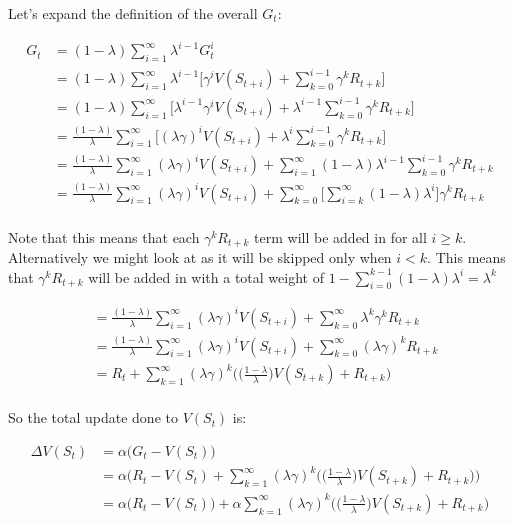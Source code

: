 \documentclass[11pt]{article}
\begin{document}
Let's expand the definition of the overall $G_t$:

\begin{align*}
G_t &= (1-\lambda) \sum_{i=1}^{\infty} \lambda^{i-1}G^i_t \\
&= (1-\lambda) \sum_{i=1}^{\infty} \lambda^{i-1} \big[ \gamma^i V(S_{t+i}) + \sum_{k=0}^{i - 1} \gamma^k R_{t+k} \big] \\
&= (1-\lambda) \sum_{i=1}^{\infty} \big[ \lambda^{i-1} \gamma^i V(S_{t+i}) + \lambda^{i-1}\sum_{k=0}^{i - 1} \gamma^k R_{t+k} \big] \\
&= \frac{(1-\lambda)}{\lambda} \sum_{i=1}^{\infty} \big[ (\lambda \gamma)^i V(S_{t+i}) + \lambda^{i}\sum_{k=0}^{i - 1} \gamma^k R_{t+k} \big] \\
&= \frac{(1-\lambda)}{\lambda} \sum_{i=1}^{\infty} (\lambda \gamma)^i V(S_{t+i}) + \sum_{i=1}^{\infty} (1 - \lambda) \lambda^{i - 1}\sum_{k=0}^{i - 1} \gamma^k R_{t+k} \\
&= \frac{(1-\lambda)}{\lambda} \sum_{i=1}^{\infty} (\lambda \gamma)^i V(S_{t+i}) + \sum_{k=0}^\infty \big[ \sum_{i=k}^\infty (1 - \lambda)\lambda^i \big]\gamma^k R_{t+k} \\
\end{align*}

Note that this means that each $\gamma^k R_{t+k}$ term will be added in for all $i \geq k$.
Alternatively we might look at as it will be skipped only when $i < k$.
This means that $\gamma^k R_{t+k}$ will be added in with a total weight of $1 - \sum_{i=0}^{k - 1} (1 - \lambda) \lambda^{i} = \lambda^k$

\begin{align*}
&= \frac{(1-\lambda)}{\lambda} \sum_{i=1}^{\infty} (\lambda \gamma)^i V(S_{t+i}) + \sum_{k=0}^\infty \lambda^k \gamma^k R_{t+k} \\
&= \frac{(1-\lambda)}{\lambda} \sum_{i=1}^{\infty} (\lambda \gamma)^i V(S_{t+i}) + \sum_{k=0}^\infty (\lambda \gamma)^k R_{t+k} \\
&= R_t + \sum_{k=1}^{\infty} (\lambda \gamma)^k \bigg(\big(\frac{1 - \lambda}{\lambda}\big)V(S_{t+k}) + R_{t+k} \bigg) \\
\end{align*}

So the total update done to $V(S_t)$ is:

\begin{align*}
\Delta V(S_t) &= \alpha\big(G_t - V(S_t)\big) \\
&= \alpha\Big(R_t - V(S_t) + \sum_{k=1}^{\infty} (\lambda \gamma)^k \bigg(\big(\frac{1 - \lambda}{\lambda}\big)V(S_{t+k}) + R_{t+k} \bigg) \Big) \\
&= \alpha\big(R_t - V(S_t) \big) + \alpha \sum_{k=1}^{\infty} (\lambda \gamma)^k \bigg(\big(\frac{1 - \lambda}{\lambda}\big)V(S_{t+k}) + R_{t+k} \bigg)  \\
\end{align*}
\end{document}
